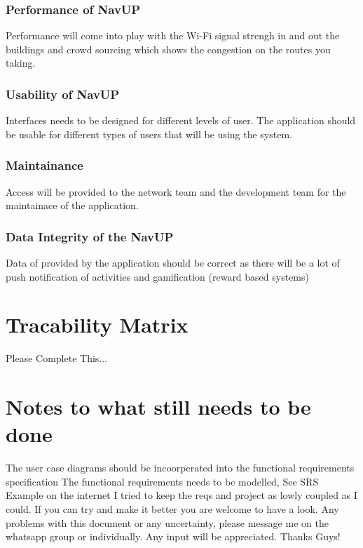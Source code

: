 \documentclass{article}
\begin{document}
\subsubsection{Performance of NavUP}
Performance will come into play with the Wi-Fi signal strengh in and out the buildings and crowd sourcing which shows the congestion on the routes you taking.
\subsubsection{Usability of NavUP}
Interfaces needs to be designed for different levels of user. The application should be usable for different types of users that will be using the system.
\subsubsection{Maintainance}
Access will be provided to the network team and the development team for the maintainace of the application.
\subsubsection{Data Integrity of the NavUP}
Data of provided by the application should be correct as there will be a lot of push notification of activities and gamification (reward based systems)

\newpage
\centering
\section{Tracability Matrix}
 
Please Complete This...

\newpage
\centering


\section{Notes to what still needs to be done}
The user case diagrams should be incoorperated into the functional requirements specification
The functional requirements needs to be modelled, See SRS Example on the internet 
I tried to keep the reqs and project as lowly coupled as I could. If you can try and make it better you are welcome to have a look.
Any problems with this document or any uncertainty, please message me on the whatsapp group or individually.
Any input will be appreciated.
Thanks Guys!
\end{document}
